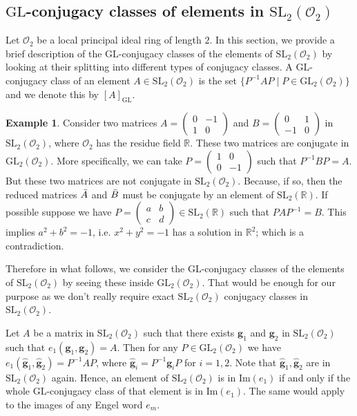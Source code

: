 \documentclass[10pt,twoside]{amsart}
\newcommand{\GL}{\mathrm{GL}}
\newcommand{\SL}{\mathrm{SL}}
\newcommand{\im}{\mathrm{Im}}
\newcommand{\R}{\mathcal{O}_2}
\theoremstyle{definition}
\theoremstyle{definition}
\newtheorem{example}[theorem]{Example}
\begin{document}
\subsection{$\GL$-conjugacy classes of elements in $\SL_2(\R)$}{\label{O_2conj}}
Let $\R$ be a local principal ideal ring of length $2$. In this section, we provide a brief description of the $\GL$-conjugacy classes of the elements of $\SL_2(\R)$ by looking at their splitting into different types of conjugacy classes. A $\GL$-conjugacy class of an element $A\in \SL_2(\R)$ is the set $\{P^{-1}AP\mid P\in \GL_2(\R)\}$ and we denote this by $[A]_{\GL}$. 
\begin{example}
Consider two matrices $A=\left(\begin{array}{cc}
0  & -1 \\ 1 & 0 \end{array}\right)$ and $B=\left(\begin{array}{cc}   0  & 1 \\  -1 & 0
\end{array}\right)$ in $\SL_2(\R)$, where $\R$ has the residue field $\mathbb{R}$. These two matrices are conjugate in $\GL_2(\R)$. More specifically, we can take $P=\left(\begin{array}{cc} 1 & 0 \\  0 & -1 \end{array}\right)$ such that $P^{-1}BP=A$. But these two matrices are not conjugate in $\SL_2(\R)$. Because, if so, then the reduced matrices $\Bar{A}$ and $\Bar{B}$ must be conjugate by an element of $\SL_2(\mathbb R)$. If possible suppose we have $P=\left(\begin{array}{cc} a & b \\ c & d
\end{array}\right)\in \SL_2(\mathbb{R})$ such that $PAP^{-1}=B$. This implies $a^2 + b^2 = -1$, i.e. $x^2+y^2=-1$ has a solution in $\mathbb{R}^2$; which is a contradiction. 
\end{example}
\noindent Therefore in what follows, we consider the $\GL$-conjugacy classes of the elements of $\SL_2(\R)$ by seeing these inside $\GL_2(\R)$. That would be enough for our purpose as we don't really require exact $\SL_2(\R)$ conjugacy classes in $\SL_2(\R)$. 
 
Let $A$ be a matrix in $\SL_2(\R)$ such that there exists $\mathbf{g}_1$ and $\mathbf{g}_2$ in $\SL_2(\R)$ such that $e_1(\mathbf{g}_1, \mathbf{g}_2) = A$. Then for any $P\in\GL_2(\R)$ we have $e_1(\widehat{\mathbf{g}}_1, \widehat{\mathbf{g}}_2) = P^{-1}AP$, where $\widehat{\mathbf{g}}_i = P^{-1}\mathbf{g}_i P$ for $i=1, 2$. Note that $\widehat{\mathbf{g}}_1, \widehat{\mathbf{g}}_2$ are in $\SL_2(\R)$ again. Hence, an element of $\SL_2(\R)$ is in $\im(e_1)$ if and only if the whole $\GL$-conjugacy class of that element is in $\im(e_1)$. The same would apply to the images of any Engel word $e_m$.
\end{document}
